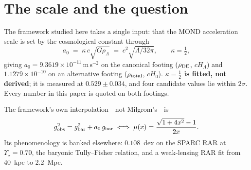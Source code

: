 \documentclass[aps,prd,twocolumn,superscriptaddress,nofootinbib,floatfix]{revtex4-2}
\begin{document}
\begin{abstract}
previously considered fail at opposite ends of that function. We then answer the squeeze
directly, on $175$ SPARC rotation curves with $\Upsilon_\star$ refit per kernel: the standard
monotone family $\mu_n(x)=x/(1+x^n)^{1/n}$ \textbf{clears it}. At $n=10$ the quadrupole is
$0.08$--$0.21\times$ the Cassini ceiling across the full $\pm2\sigma$ of the \emph{measured}
external field on both footings, and the $1$~AU monopole is $4\times10^{-28}$ of the Mars
budget, against $5.6$--$6.4\times$ and $3.3\times10^{4}$ for the interpolation of
Eq.~\eqref{eq:a0line}. \textbf{Crucially $a_0$ is untouched}: the deep-MOND limit is identical
across the family to $5\times10^{-7}$, so Eq.~\eqref{eq:a0}, the amplitude law, the baryonic
Tully--Fisher relation and the fitted $\kappa$ all survive the swap. \emph{The solar system was
never a statement about $a_0$; it is a statement about the transition region.} The cost is
stated rather than hidden: the RAR fit degrades from $0.108$ to $0.127$~dex. The binding
obstruction therefore moves---it is no longer the solar system but the double count between the
phantom and any clustering dark sector, which is kernel-independent and which no choice of
$\mu_n$ affects.
\end{abstract}

\maketitle

\section{The scale and the question}

The framework studied here takes a single input: that the MOND acceleration scale is set
by the cosmological constant through
\begin{equation}
a_0 \;=\; \kappa\,c\sqrt{G\rho_\Lambda} \;=\; c^2\sqrt{\Lambda/32\pi},
\qquad \kappa = \tfrac12 ,
\label{eq:a0}
\end{equation}
giving $a_0 = 9.3619\times10^{-11}\,\mathrm{m\,s^{-2}}$ on the canonical footing
($\rho_{\rm DE}$, $cH_\Lambda$) and $1.1279\times10^{-10}$ on an alternative footing
($\rho_{\rm total}$, $cH_0$). \textbf{$\kappa=\tfrac12$ is fitted, not derived}; it is
measured at $0.529\pm0.034$, and four candidate values lie within $2\sigma$. Every
number in this paper is quoted on both footings.

The framework's own interpolation---not Milgrom's---is
\begin{equation}
g_{\rm obs}^2 = g_{\rm bar}^2 + a_0\,g_{\rm bar}
\;\Longleftrightarrow\;
\mu(x) = \frac{\sqrt{1+4x^2}-1}{2x} .
\label{eq:a0line}
\end{equation}
Its phenomenology is banked elsewhere: $0.108$~dex on the SPARC RAR at
$\Upsilon_\star = 0.70$, the baryonic Tully--Fisher relation, and a weak-lensing RAR
fit from $40$~kpc to $2.2$~Mpc.
\end{document}
